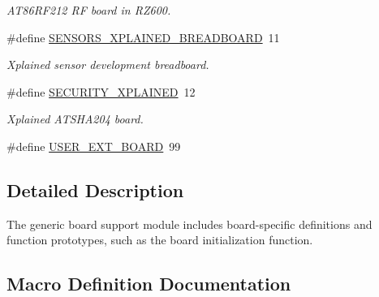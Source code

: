 \begin{DoxyCompactItemize}
\begin{DoxyCompactList}\small\item\em A\+T86\+R\+F212 R\+F board in R\+Z600. \end{DoxyCompactList}\item 
\hypertarget{group__group__common__boards_ga80102032338e3add4f64cbc40efc4376}{}\#define \hyperlink{group__group__common__boards_ga80102032338e3add4f64cbc40efc4376}{S\+E\+N\+S\+O\+R\+S\+\_\+\+X\+P\+L\+A\+I\+N\+E\+D\+\_\+\+B\+R\+E\+A\+D\+B\+O\+A\+R\+D}~11\label{group__group__common__boards_ga80102032338e3add4f64cbc40efc4376}

\begin{DoxyCompactList}\small\item\em Xplained sensor development breadboard. \end{DoxyCompactList}\item 
\hypertarget{group__group__common__boards_ga00921a34b346ce468cedc9a09b58a881}{}\#define \hyperlink{group__group__common__boards_ga00921a34b346ce468cedc9a09b58a881}{S\+E\+C\+U\+R\+I\+T\+Y\+\_\+\+X\+P\+L\+A\+I\+N\+E\+D}~12\label{group__group__common__boards_ga00921a34b346ce468cedc9a09b58a881}

\begin{DoxyCompactList}\small\item\em Xplained A\+T\+S\+H\+A204 board. \end{DoxyCompactList}\item 
\#define \hyperlink{group__group__common__boards_gaf75bc91f67cb2a761894691a9175a639}{U\+S\+E\+R\+\_\+\+E\+X\+T\+\_\+\+B\+O\+A\+R\+D}~99
\end{DoxyCompactItemize}


\subsection{Detailed Description}
The generic board support module includes board-\/specific definitions and function prototypes, such as the board initialization function. 

\subsection{Macro Definition Documentation}
\hypertarget{group__group__common__boards_gac33d75ae101690822610338fdff2e95b}{}
